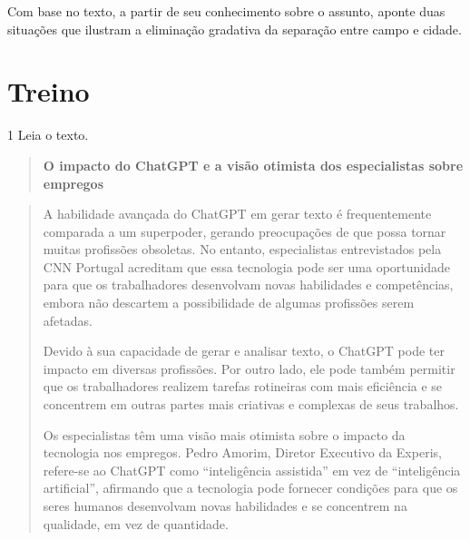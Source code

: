 
Com base no texto, a partir de seu conhecimento sobre o assunto, aponte
duas situações que ilustram a eliminação gradativa da separação entre
campo e cidade.


\section{Treino}

\num{1} Leia o texto.

\begin{quote}
\textbf{O impacto do ChatGPT e a visão otimista dos especialistas sobre
empregos}
\end{quote}

\begin{quote}
A habilidade avançada do ChatGPT em gerar texto é frequentemente
comparada a um superpoder, gerando preocupações de que possa tornar
muitas profissões obsoletas. No entanto, especialistas entrevistados
pela CNN Portugal acreditam que essa tecnologia pode ser uma
oportunidade para que os trabalhadores desenvolvam novas habilidades e
competências, embora não descartem a possibilidade de algumas profissões
serem afetadas.

Devido à sua capacidade de gerar e analisar texto, o ChatGPT pode ter
impacto em diversas profissões. Por outro lado, ele pode também permitir
que os trabalhadores realizem tarefas rotineiras com mais eficiência e
se concentrem em outras partes mais criativas e complexas de seus
trabalhos.

Os especialistas têm uma visão mais otimista sobre o impacto da
tecnologia nos empregos. Pedro Amorim, Diretor Executivo da Experis,
refere-se ao ChatGPT como ``inteligência assistida'' em vez de
``inteligência artificial'', afirmando que a tecnologia pode fornecer
condições para que os seres humanos desenvolvam novas habilidades e se
concentrem na qualidade, em vez de quantidade.
\end{quote}


